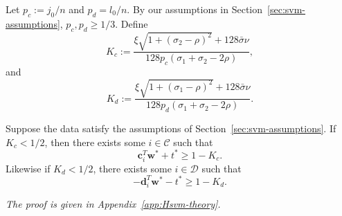 \documentclass[twoside,11pt]{article}
\renewcommand{\c}{\bm{c}}
\renewcommand{\d}{\bm{d}}
\newcommand\w{\bm{w}}
\newcommand\CC{\mathcal{C}}
\newcommand\DD{\mathcal{D}}
\begin{document}
Let $p_c := j_0/n$ and $p_d = l_0/n$. By our assumptions in Section~\ref{sec:svm-assumptions}, $p_c,p_d \geq 1/3$. Define
\[
    K_c := \frac{\xi\sqrt{1 + (\sigma_2 - \rho)^2} + 128\bar{\sigma}\nu}{128p_c(\sigma_1 + \sigma_2 - 2\rho)},
\]
and
\[
    K_d := \frac{\xi\sqrt{1 + (\sigma_1 - \rho)^2} + 128\bar{\sigma}\nu}{128p_d(\sigma_1 + \sigma_2 - 2\rho)}.
\]
\begin{lemma} \label{lem:Hsvm-theta-bound}
    Suppose the data satisfy the assumptions of Section~\ref{sec:svm-assumptions}. If $K_c < 1/2$, then there exists some $i \in \CC$ such that
    \[
        \c_i^T\w^* + t^* \geq 1 - K_c.
    \]
     Likewise if $K_d < 1/2$, there exists some $i \in \DD$ such that
     \[
        -\d_i^T\w^* - t^* \geq 1 - K_d.
      \]
    \end{lemma}
    \noindent\emph{The proof is given in Appendix~\ref{app:Hsvm-theory}.}
\end{document}
